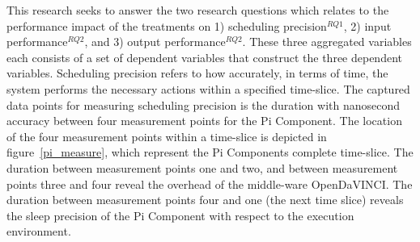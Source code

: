 This research seeks to answer the two research questions which relates to the performance impact of the treatments on 1) scheduling precision$^{RQ1}$, 2) input performance$^{RQ2}$, and 3) output performance$^{RQ2}$. These three aggregated variables each consists of a set of dependent variables that construct the three dependent variables. Scheduling precision refers to how accurately, in terms of time, the system performs the necessary actions within a specified time-slice. The captured data points for measuring scheduling precision is the duration with nanosecond accuracy between four measurement points for the Pi Component. The location of the four measurement points within a time-slice is depicted in figure~\ref{pi_measure}, which represent the Pi Components complete time-slice. The duration between measurement points one and two, and between measurement points three and four reveal the overhead of the middle-ware OpenDaVINCI. The duration between measurement points four and one (the next time slice) reveals the sleep precision of the Pi Component with respect to the execution environment.\\ 




